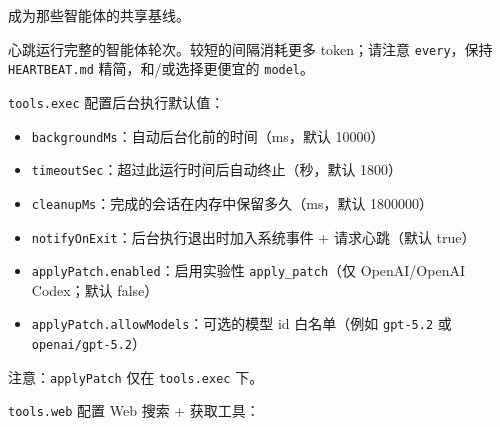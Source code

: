 成为那些智能体的共享基线。

心跳运行完整的智能体轮次。较短的间隔消耗更多 token；请注意
\texttt{every}，保持 \texttt{HEARTBEAT.md} 精简，和/或选择更便宜的 \texttt{model}。

\texttt{tools.exec} 配置后台执行默认值：

\begin{itemize}
  \item \texttt{backgroundMs}：自动后台化前的时间（ms，默认 10000）
  \item \texttt{timeoutSec}：超过此运行时间后自动终止（秒，默认 1800）
  \item \texttt{cleanupMs}：完成的会话在内存中保留多久（ms，默认 1800000）
  \item \texttt{notifyOnExit}：后台执行退出时加入系统事件 + 请求心跳（默认 true）
  \item \texttt{applyPatch.enabled}：启用实验性 \texttt{apply\_patch}（仅 OpenAI/OpenAI Codex；默认 false）
  \item \texttt{applyPatch.allowModels}：可选的模型 id 白名单（例如 \texttt{gpt-5.2} 或 \texttt{openai/gpt-5.2}）
\end{itemize}

注意：\texttt{applyPatch} 仅在 \texttt{tools.exec} 下。

\texttt{tools.web} 配置 Web 搜索 + 获取工具：

